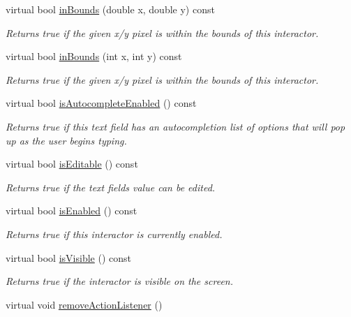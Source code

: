 \begin{DoxyCompactItemize}
virtual bool \mbox{\hyperlink{classsgl_1_1GInteractor_afc480f652b8c5f1fb255e2269ce68879}{in\+Bounds}} (double x, double y) const
\begin{DoxyCompactList}\small\item\em Returns true if the given x/y pixel is within the bounds of this interactor. \end{DoxyCompactList}\item 
virtual bool \mbox{\hyperlink{classsgl_1_1GInteractor_ae6d7982c1c627b677a5e776ca86118ed}{in\+Bounds}} (int x, int y) const
\begin{DoxyCompactList}\small\item\em Returns true if the given x/y pixel is within the bounds of this interactor. \end{DoxyCompactList}\item 
virtual bool \mbox{\hyperlink{classsgl_1_1GTextField_a7528cfb0542ac5268efe1d7362b89344}{is\+Autocomplete\+Enabled}} () const
\begin{DoxyCompactList}\small\item\em Returns true if this text field has an autocompletion list of options that will pop up as the user begins typing. \end{DoxyCompactList}\item 
virtual bool \mbox{\hyperlink{classsgl_1_1GTextField_a012b5afb54e037e6c5498cf0932a521b}{is\+Editable}} () const
\begin{DoxyCompactList}\small\item\em Returns true if the text field\textquotesingle{}s value can be edited. \end{DoxyCompactList}\item 
virtual bool \mbox{\hyperlink{classsgl_1_1GInteractor_aacb819fb241851fd9fc045271baa4034}{is\+Enabled}} () const
\begin{DoxyCompactList}\small\item\em Returns true if this interactor is currently enabled. \end{DoxyCompactList}\item 
virtual bool \mbox{\hyperlink{classsgl_1_1GInteractor_a9d8a6cfb13917785c143e74d40e4e2be}{is\+Visible}} () const
\begin{DoxyCompactList}\small\item\em Returns true if the interactor is visible on the screen. \end{DoxyCompactList}\item 
virtual void \mbox{\hyperlink{classsgl_1_1GInteractor_ab7fe7a876367b87cf7202f947f1d05e4}{remove\+Action\+Listener}} ()

\end{DoxyCompactItemize}
